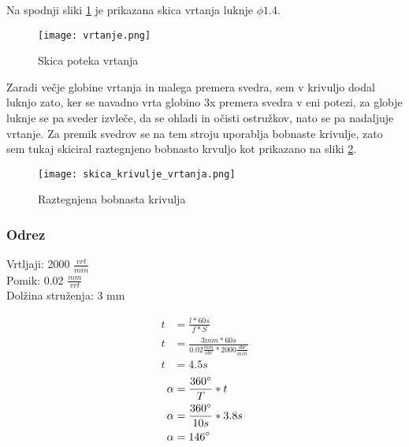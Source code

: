 Na spodnji sliki \ref{vrtanje} je prikazana skica vrtanja
luknje $\phi 1.4$.
\begin{figure}[H]
	\begin{center}
		\texttt{[image: vrtanje.png]}
		\caption{Skica poteka vrtanja
			\cite{lasten}}
		\label{vrtanje}
	\end{center}
\end{figure}

Zaradi večje globine vrtanja in malega premera svedra,
sem v krivuljo dodal luknjo zato, ker se navadno vrta globino 3x
premera svedra v eni potezi, za globje luknje se pa sveder
izvleče, da se ohladi in očisti ostružkov, nato se pa nadaljuje vrtanje.
Za premik svedrov se na tem stroju uporablja bobnaste krivulje,
zato sem tukaj skiciral raztegnjeno bobnasto krvuljo kot prikazano
na sliki \ref{raztegnjen_boben}.

\begin{figure}[H]
	\begin{center}
		\texttt{[image: skica\_krivulje\_vrtanja.png]}
		\caption{Raztegnjena bobnasta krivulja
			\cite{lasten}}
		\label{raztegnjen_boben}
	\end{center}
\end{figure}
\newpage

\subsubsection{Odrez}
\label{izracun_odreza}
Vrtljaji: 2000 \( \frac{vrt}{min} \) \\
Pomik: 0.02 \( \frac{mm}{vrt} \) \\
Dolžina struženja: 3 mm

\begin{equation}
	\begin{split}
		t &= \frac{l*60s}{f*S} \\
		t &= \frac{3mm*60s}{0.02\frac{mm}{obr}*2000\frac{obr}{min}} \\
		t &= 4.5 s
	\end{split}
\end{equation}
\begin{equation}
	\begin{split}
		\alpha &= \frac{360\degree}{T} * t \\
		\alpha &= \frac{360\degree}{10s} * 3.8 s\\
		\alpha &= 146\degree
	\end{split}
\end{equation}

